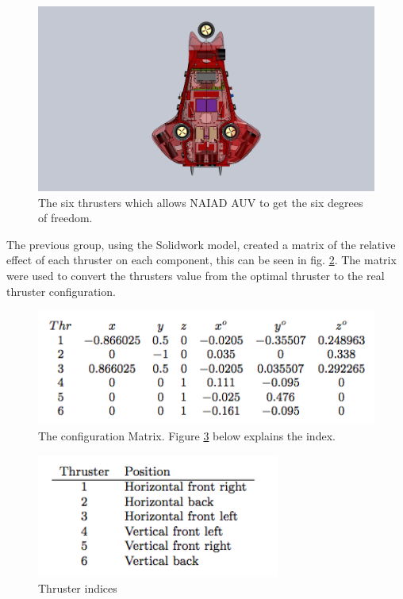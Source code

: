 	\begin{figure}[!ht]
	\begin{center}
		\includegraphics[width=120mm]{./images/mechanics/thcon.png}
		\caption{The six thrusters which allows NAIAD AUV to get the six degrees of freedom.}
		\label{thcon}
	\end{center}
\end{figure}

The previous group, using the Solidwork model, created a matrix of the relative effect of each thruster on each component, this can be seen in fig. \ref{matrix}. The matrix were used to convert the thrusters value from the optimal thruster to the real thruster configuration.

	\begin{figure}[!ht]
	\begin{center}
		\includegraphics[width=120mm]{./images/mechanics/matrix.png}
		\caption{The configuration Matrix. Figure \ref{matrixindex} below explains the index.}
		\label{matrix}
	\end{center}
\end{figure}

	\begin{figure}[!ht]
	\begin{center}
		\includegraphics[width=80mm]{./images/mechanics/matrixindex.png}			\caption{Thruster indices}
		\label{matrixindex}
	\end{center}
	\end{figure}

